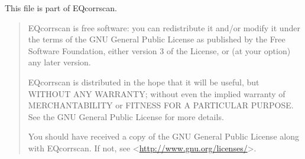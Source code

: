 \documentclass[a4paper,10pt,english]{sphinxmanual}
\begin{document}
This file is part of EQcorrscan.
\begin{quote}

EQcorrscan is free software: you can redistribute it and/or modify
it under the terms of the GNU General Public License as published by
the Free Software Foundation, either version 3 of the License, or
(at your option) any later version.

EQcorrscan is distributed in the hope that it will be useful,
but WITHOUT ANY WARRANTY; without even the implied warranty of
MERCHANTABILITY or FITNESS FOR A PARTICULAR PURPOSE.  See the
GNU General Public License for more details.

You should have received a copy of the GNU General Public License
along with EQcorrscan.  If not, see \textless{}\href{http://www.gnu.org/licenses/}{http://www.gnu.org/licenses/}\textgreater{}.
\end{quote}
\end{document}
